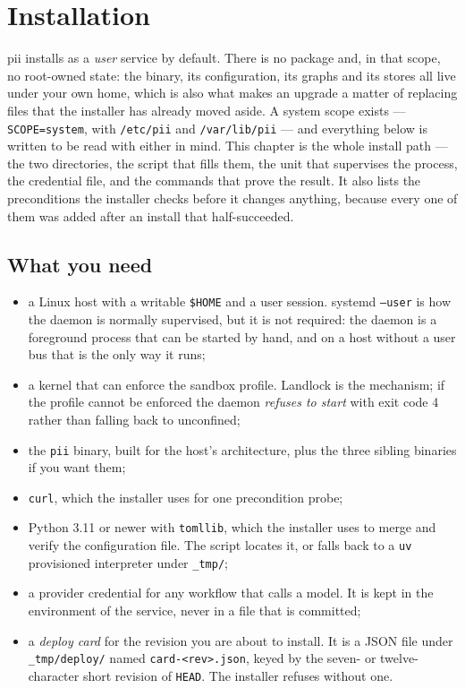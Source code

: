 \chapter{Installation}

\label{ch:install}

pii installs as a \emph{user} service by default. There is no package and, in that scope,
no root-owned state: the binary, its configuration, its graphs and its stores all live under
your own home, which is also what makes an upgrade a matter of replacing files that the
installer has already moved aside. A system scope exists --- \texttt{SCOPE=system}, with
\texttt{/etc/pii} and \texttt{/var/lib/pii} --- and everything below is written to be read
with either in mind. This chapter is the whole install path --- the two
directories, the script that fills them, the unit that supervises the process, the
credential file, and the commands that prove the result. It also lists the
preconditions the installer checks before it changes anything, because every one of them
was added after an install that half-succeeded.

\section{What you need}

\begin{itemize}
	\item a Linux host with a writable \texttt{\$HOME} and a user session. systemd
	\texttt{--user} is how the daemon is normally supervised, but it is not required: the
	daemon is a foreground process that can be started by hand, and on a host without a
	user bus that is the only way it runs;
	\item a kernel that can enforce the sandbox profile. Landlock is the mechanism; if the
	profile cannot be enforced the daemon \emph{refuses to start} with exit code 4 rather
	than falling back to unconfined;
	\item the \texttt{pii} binary, built for the host's architecture, plus the three
	sibling binaries if you want them;
	\item \texttt{curl}, which the installer uses for one precondition probe;
	\item Python 3.11 or newer with \texttt{tomllib}, which the installer uses to merge and
	verify the configuration file. The script locates it, or falls back to a \texttt{uv}
	provisioned interpreter under \texttt{\_tmp/};
	\item a provider credential for any workflow that calls a model. It is kept in the
	environment of the service, never in a file that is committed;
	\item a \emph{deploy card} for the revision you are about to install. It is a JSON file
        under \texttt{\_tmp/deploy/} named \texttt{card-\textless{}rev\textgreater{}.json},
keyed by the seven- or
	twelve-character short revision of \texttt{HEAD}. The installer refuses without one.
\end{itemize}

